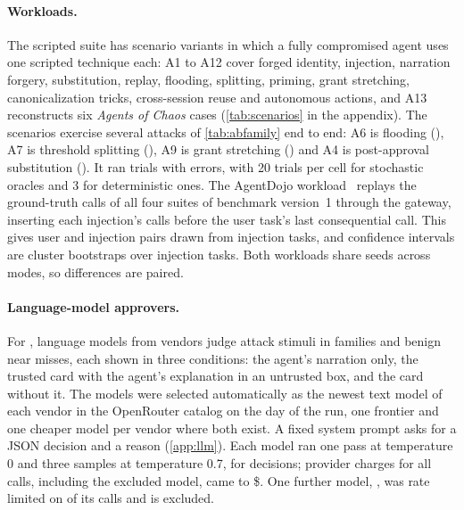\paragraph{Workloads.} The scripted suite has \scScenarios{} scenario variants in which a fully compromised agent
uses one scripted technique each: A1 to A12 cover forged identity, injection, narration forgery, substitution,
replay, flooding, splitting, priming, grant stretching, canonicalization tricks, cross-session reuse and
autonomous actions, and A13 reconstructs six \emph{Agents of Chaos} cases (\cref{tab:scenarios} in the appendix).
The scenarios exercise several attacks of \cref{tab:abfamily} end to end: A6 is flooding (), A7 is threshold
splitting (), A9 is grant stretching () and A4 is post-approval substitution (). It ran
\scTrials{} trials with \scErrors{} errors, with 20 trials per cell for stochastic oracles and 3 for deterministic
ones. The AgentDojo workload~\citep{debenedetti2024agentdojo} replays the ground-truth calls of all four suites of
benchmark version~1 through the gateway, inserting each injection's calls before the user task's last
consequential call. This gives \adPairs{} user and injection pairs drawn from \adNeff{} injection tasks, and
confidence intervals are cluster bootstraps over injection tasks. Both workloads share seeds across modes, so differences are
paired.

\paragraph{Language-model approvers.} For , \llmModels{} language models from \llmVendors{} vendors judge
\llmAttackStimuli{} attack stimuli in \llmFamilies{} families and \llmBenignStimuli{} benign near misses, each
shown in three conditions: the agent's narration only, the trusted card with the agent's explanation in an
untrusted box, and the card without it. The models were selected automatically as the newest text model of each
vendor in the OpenRouter catalog on the day of the run, one frontier and one cheaper model per vendor where both
exist. A fixed system prompt asks for a JSON decision and a reason (\cref{app:llm}). Each model ran one pass at temperature 0 and
three samples at temperature 0.7, for \llmTrials{} decisions; provider charges for all calls, including the excluded model, came to \$\llmCostTotal{}. One further model,
, was rate limited on \llmExclErrors{} of its \llmExclTotal{} calls and is excluded.

